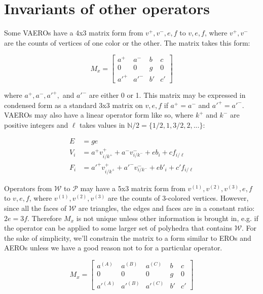 \documentclass{amsart}[12pt]
\begin{document}
\section{Invariants of other operators}
Some VAEROs have a 4x3 matrix form from $v^+, v^-, e, f$ to $v, e, f$, where
$v^+, v^-$ are the counts of vertices of one color or the other. The matrix takes
this form:

\begin{equation}
  M_x = \begin{bmatrix}
  a^+ & a^- & b & c \\
  0 & 0 & g & 0 \\
  a'^+ & a'^- & b' & c' \end{bmatrix}
\end{equation}

where $a^+, a^-, a'^+,$ and $a'^-$ are either 0 or 1. This matrix may be
expressed in condensed form as a standard 3x3 matrix on $v, e, f$ if $a^+ = a^-$
and $a'^+ = a'^-$. VAEROs may also have a linear operator form like so, where $k^+$ and $k^-$ are positive integers and $\ell$ takes values in
$\mathbb{N}/2 = \{1/2, 1, 3/2, 2, ...\}$:

\begin{equation}
  \begin{split}
  E & = ge \\
  V_i & = a^+ v^+_{i/k^+} + a^- v^-_{i/k^-} + e b_i + c f_{i/\ell} \\
  F_i & = a'^+ v^+_{i/k^+} + a'^- v^-_{i/k^-} + e b'_i + c' f_{i/\ell}
  \end{split}
\end{equation}

Operators from $\mathcal{W}$ to $\mathcal{P}$ may have a 5x3 matrix form
from $v^{(1)}, v^{(2)}, v^{(3)}, e, f$ to $v, e, f$, where $v^{(1)}, v^{(2)},
v^{(3)}$ are the counts of 3-colored vertices. However, since all the faces of
$\mathcal{W}$ are triangles, the edges and faces are in a constant ratio: $2e =
3f$. Therefore $M_x$ is not unique unless other information is brought in, e.g.
if the operator can be applied to some larger set of polyhedra that contains
$\mathcal{W}$. For the sake of simplicity, we'll constrain the matrix to a form
similar to EROs and AEROs unless we have a good reason not to for a particular
operator.

\begin{equation}
  M_x = \begin{bmatrix}
  a^{(A)} & a^{(B)} & a^{(C)} & b & c \\
  0 & 0 & 0 & g & 0 \\
  {a'}^{(A)} & {a'}^{(B)} & {a'}^{(C)} & b' & c' \end{bmatrix}
\end{equation}
\end{document}
